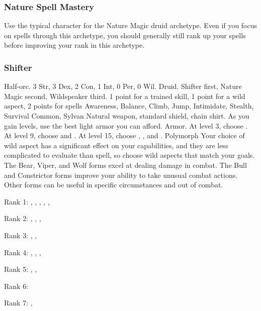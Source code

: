         \subsubsection{Nature Spell Mastery}
            Use the typical character for the Nature Magic druid archetype.
            Even if you focus on spells through this archetype, you should generally still rank up your spells before improving your rank in this archetype.

        \subsubsection{Shifter}
             Half-orc.
             3 Str, 3 Dex, 2 Con, 1 Int, 0 Per, 0 Wil.
             Druid.
             Shifter first, Nature Magic second, Wildspeaker third.
             1 point for a trained skill, 1 point for a wild aspect, 2 points for spells
             Awareness, Balance, Climb, Jump, Intimidate, Stealth, Survival
             Common, Sylvan
             Natural weapon, standard shield, chain shirt. As you gain levels, use the best light armor you can afford.
             Armor.
                At level 3, choose .
                At level 9, choose  and .
                At level 15, choose , , and .
             Polymorph
             Your choice of wild aspect has a significant effect on your capabilities, and they are less complicated to evaluate than spell, so choose wild aspects that match your goals.
            The Bear, Viper, and Wolf forms excel at dealing damage in combat.
            The Bull and Constrictor forms improve your ability to take unusual combat actions.
            Other forms can be useful in specific circumstances and out of combat.
            \begin{raggeditemize}
                \item Rank 1: , , , , , 
                \item Rank 2: , , , 
                \item Rank 3: , , 
                \item Rank 4: , , , 
                \item Rank 5: , , 
                \item Rank 6: 
                \item Rank 7: , 
            \end{raggeditemize}

